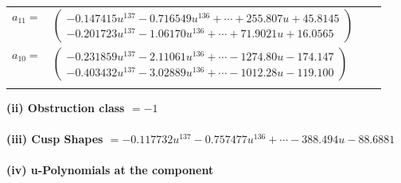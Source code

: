 \documentclass[1p]{elsarticle_modified}
\theoremstyle{definition}
\begin{document}
\begin{tabular}{m{7pt} m{180pt} m{7pt} m{180pt} }
\flushright $a_{11}=$&$\begin{pmatrix}-0.147415 u^{137}-0.716549 u^{136}+\cdots+255.807 u+45.8145\\-0.201723 u^{137}-1.06170 u^{136}+\cdots+71.9021 u+16.0565\end{pmatrix}$ \\
\flushright $a_{10}=$&$\begin{pmatrix}-0.231859 u^{137}-2.11061 u^{136}+\cdots-1274.80 u-174.147\\-0.403432 u^{137}-3.02889 u^{136}+\cdots-1012.28 u-119.100\end{pmatrix}$\\&\end{tabular}
\flushleft \textbf{(ii) Obstruction class $= -1$}\\~\\
\flushleft \textbf{(iii) Cusp Shapes $= -0.117732 u^{137}-0.757477 u^{136}+\cdots-388.494 u-88.6881$}\\~\\
\newpage\renewcommand{\arraystretch}{1}
\flushleft \textbf{(iv) u-Polynomials at the component}\newline \\
\end{document}
